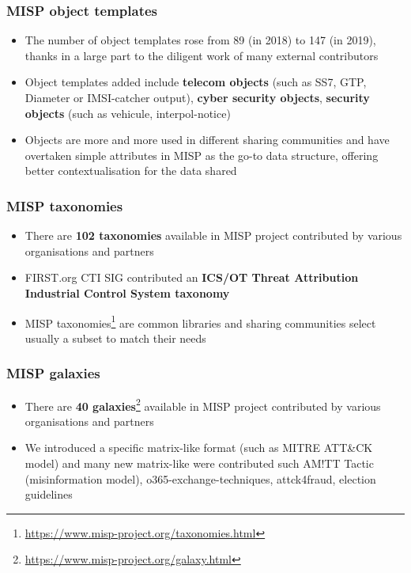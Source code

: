 \begin{frame}
        \frametitle{MISP object templates}
        \begin{itemize}
                \item The number of object templates rose from 89 (in 2018) to 147 (in 2019), thanks in a large part to the diligent work of many external contributors
                \item Object templates added include {\bf telecom objects} (such as SS7, GTP, Diameter or IMSI-catcher output), {\bf cyber security objects}, {\bf security objects} (such as vehicule, interpol-notice)
                \item Objects are more and more used in different sharing communities and have overtaken simple attributes in MISP as the go-to data structure, offering better contextualisation for the data shared
        \end{itemize}
\end{frame}

\begin{frame}
        \frametitle{MISP taxonomies}
        \begin{itemize}
                \item There are {\bf 102 taxonomies} available in MISP project contributed by various organisations and partners
                \item FIRST.org CTI SIG contributed an {\bf ICS/OT Threat Attribution Industrial Control System taxonomy}
                \item MISP taxonomies\footnote{\url{https://www.misp-project.org/taxonomies.html}} are common libraries and sharing communities select usually a subset to match their needs
        \end{itemize}
\end{frame}

\begin{frame}
        \frametitle{MISP galaxies}
        \begin{itemize}
                \item There are {\bf 40 galaxies}\footnote{\url{https://www.misp-project.org/galaxy.html}} available in MISP project contributed by various organisations and partners
                \item We introduced a specific matrix-like format (such as MITRE ATT\&CK model) and many new matrix-like were contributed such AM!TT Tactic (misinformation model), o365-exchange-techniques, attck4fraud, election guidelines
        \end{itemize}
\end{frame}


